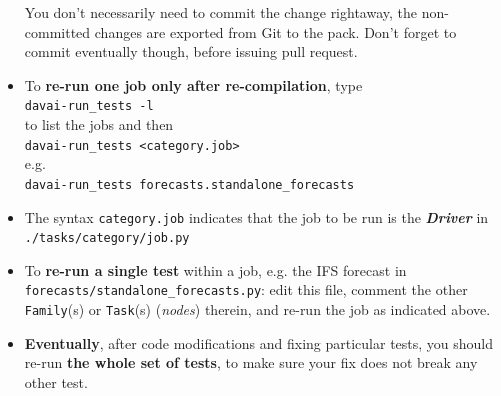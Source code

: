 \documentclass[a4paper,10pt,twoside]{article}
\begin{document}
\begin{itemize}
 You don't necessarily need to commit the change rightaway, the non-committed changes are exported from Git to the pack. Don't forget to commit eventually though, before issuing pull request.
 \item To \textbf{re-run one job only after re-compilation}, type\\ \texttt{davai-run\_tests -l}\\
 to list the jobs and then\\
 \texttt{davai-run\_tests <category.job>}\\
 e.g.\\
 \texttt{davai-run\_tests forecasts.standalone\_forecasts}
 \item The syntax \texttt{category.job} indicates that the job to be run is the \textit{\textbf{Driver}} in \texttt{./tasks/category/job.py}
 \item To \textbf{re-run a single test} within a job, e.g. the IFS forecast in \texttt{forecasts/standalone\_forecasts.py}: edit this file, comment the other \texttt{Family}(s) or \texttt{Task}(s) (\textit{nodes}) therein, and re-run the job as indicated above.
 \item \textbf{Eventually}, after code modifications and fixing particular tests, you should re-run \textbf{the whole set of tests}, to make sure your fix does not break any other test.
\end{itemize}


 
 
\newpage
\end{document}
